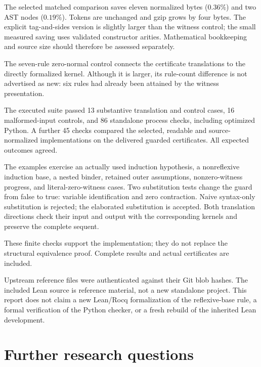 \documentclass[11pt,a4paper]{article}
\theoremstyle{definition}
\begin{document}
The selected matched comparison saves eleven normalized bytes
(\(0.36\%\)) and two AST nodes (\(0.19\%\)). Tokens are unchanged and
gzip grows by four bytes. The explicit tag-and-sides version is slightly
larger than the witness control; the small measured saving uses
validated constructor arities. Mathematical bookkeeping and source
size should therefore be assessed separately.

The seven-rule zero-normal control connects the certificate translations
to the directly formalized kernel. Although it is larger, its rule-count
difference is not advertised as new: six rules had already been attained
by the witness presentation.

The executed suite passed 13 substantive translation and control cases, 16 malformed-input controls, and 86 standalone process checks, including optimized Python. A further 45 checks compared the selected, readable and source-normalized implementations on the delivered guarded certificates. All expected outcomes agreed.

The examples exercise an actually used induction hypothesis, a nonreflexive induction base, a nested binder, retained outer assumptions, nonzero-witness progress, and literal-zero-witness cases. Two substitution tests change the guard from false to true: variable identification and zero contraction. Naive syntax-only substitution is rejected; the elaborated substitution is accepted. Both translation directions check their input and output with the corresponding kernels and preserve the complete sequent.

These finite checks support the implementation; they do not replace the structural equivalence proof. Complete results and actual certificates are included.


Upstream reference files were authenticated against their Git blob hashes.
The included Lean source is reference material, not a new standalone
project. This report does not claim a new Lean/Rocq formalization of the
reflexive-base rule, a formal verification of the Python checker, or a
fresh rebuild of the inherited Lean development.

\section{Further research questions}
\end{document}
